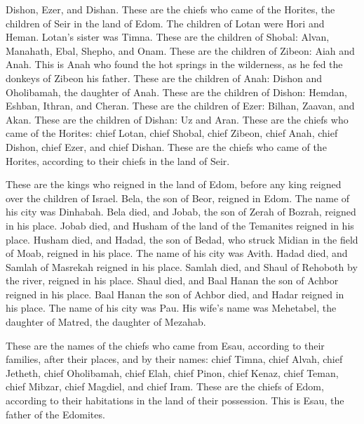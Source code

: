 {Dishon, Ezer, and Dishan. These are the chiefs who came of the Horites, the children of Seir in the land of Edom.
The children of Lotan were Hori and Heman. Lotan’s sister was Timna.
These are the children of Shobal: Alvan, Manahath, Ebal, Shepho, and Onam.
These are the children of Zibeon: Aiah and Anah. This is Anah who found the hot springs in the wilderness, as he fed the donkeys of Zibeon his father.
These are the children of Anah: Dishon and Oholibamah, the daughter of Anah.
These are the children of Dishon: Hemdan, Eshban, Ithran, and Cheran.
These are the children of Ezer: Bilhan, Zaavan, and Akan.
These are the children of Dishan: Uz and Aran.
These are the chiefs who came of the Horites: chief Lotan, chief Shobal, chief Zibeon, chief Anah,
chief Dishon, chief Ezer, and chief Dishan. These are the chiefs who came of the Horites, according to their chiefs in the land of Seir.
\par }{\PP {}These are the kings who reigned in the land of Edom, before any king reigned over the children of Israel.
Bela, the son of Beor, reigned in Edom. The name of his city was Dinhabah.
Bela died, and Jobab, the son of Zerah of Bozrah, reigned in his place.
Jobab died, and Husham of the land of the Temanites reigned in his place.
Husham died, and Hadad, the son of Bedad, who struck Midian in the field of Moab, reigned in his place. The name of his city was Avith.
Hadad died, and Samlah of Masrekah reigned in his place.
Samlah died, and Shaul of Rehoboth by the river, reigned in his place.
Shaul died, and Baal Hanan the son of Achbor reigned in his place.
Baal Hanan the son of Achbor died, and Hadar reigned in his place. The name of his city was Pau. His wife’s name was Mehetabel, the daughter of Matred, the daughter of Mezahab.
\par }{\PP {}These are the names of the chiefs who came from Esau, according to their families, after their places, and by their names: chief Timna, chief Alvah, chief Jetheth,
chief Oholibamah, chief Elah, chief Pinon,
chief Kenaz, chief Teman, chief Mibzar,
chief Magdiel, and chief Iram. These are the chiefs of Edom, according to their habitations in the land of their possession. This is Esau, the father of the Edomites.

}
